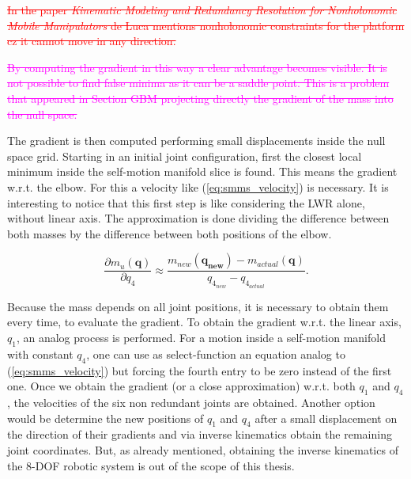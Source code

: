 \textcolor{red}{\st{In the paper \textit{Kinematic Modeling and Redundancy Resolution for Nonholonomic Mobile Manipulators} de Luca  mentions nonholonomic constraints for the platform cz it cannot move in any direction.} } 






\textcolor{magenta}{ \st{By computing the gradient in this way a clear advantage becomes visible. It is not possible to find false minima as it can be a saddle point. This is a problem that appeared in Section GBM  projecting directly the gradient of the mass into the null space.} } 


The gradient is then computed performing small displacements inside the null space grid. Starting in an initial joint configuration, first the closest local minimum inside the self-motion manifold slice is found. This means the gradient w.r.t. the elbow. For this a velocity like (\ref{eq:smms_velocity}) is necessary. It is interesting to notice that this first step is like considering the LWR alone, without linear axis. The approximation is done dividing the difference between both  masses by the difference between both positions of the elbow. 



\begin{equation}
\frac{\partial {m_u(\mathbf{q})}}{\partial {q_4}} \approx \frac{m_{new}(\mathbf{q_{new}}) - m_{actual}(\mathbf{q})}{ q_{4_{new}} - q_{4_{actual}}}.
\label{eq:approx_grad_q4}
\end{equation}



Because the mass depends on all joint positions, it is necessary to obtain them every time, to evaluate the gradient. To obtain the gradient w.r.t. the linear axis, $q_1$, an analog process is performed. For a motion inside a self-motion manifold with constant $q_4$, one can use as select-function an equation analog to (\ref{eq:smms_velocity}) but forcing the fourth entry to be zero instead of the first one. 
Once we obtain the gradient (or a close approximation) w.r.t. both $q_1$ and $q_4$, the velocities of the six non redundant joints are obtained. 
Another option would be determine the new positions of $q_1$ and $q_4$ after a small displacement on the direction of their gradients and via inverse kinematics obtain the remaining joint coordinates. But, as already mentioned, obtaining the inverse kinematics of the 8-DOF robotic system is out of the scope of this thesis.



